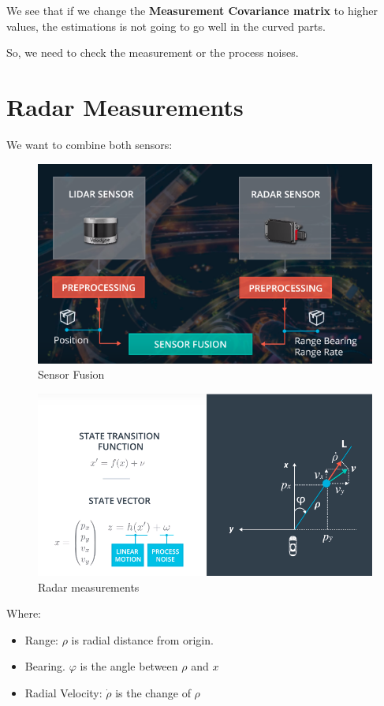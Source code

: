\documentclass[11pt, a4paper]{article}
\begin{document}
We see that if we change the \textbf{Measurement Covariance matrix} to higher values, the estimations is not going to go well in the curved parts. 

So, we need to check the measurement or the process noises. 

\section{Radar Measurements}%
\label{sec:radar_measurements}



We want to combine both sensors:

\begin{figure}[htpb!]
	\centering
	\includegraphics[width=0.8\linewidth]{sensor_fusion}
	\caption{Sensor Fusion}
	\label{fig:sensor_fusion}
\end{figure}


\begin{figure}[htpb!]
	\centering
	\includegraphics[width=0.8\linewidth]{radar_measurements}
	\caption{Radar measurements}
	\label{fig:radar_measurements}
\end{figure}



Where:
\begin{itemize}
	\item Range: $\rho$ is radial distance from origin.
	\item Bearing. $\varphi$ is the angle between $\rho$ and $x$
	\item Radial Velocity: $\dot{\rho}$ is the change of $\rho$
\end{itemize}
\end{document}
